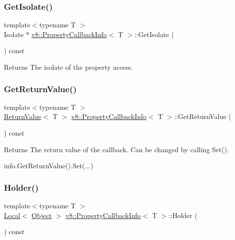 \subsubsection{\texorpdfstring{Get\+Isolate()}{GetIsolate()}}
{\footnotesize\ttfamily template$<$typename T $>$ \\
Isolate $\ast$ \mbox{\hyperlink{classv8_1_1PropertyCallbackInfo}{v8\+::\+Property\+Callback\+Info}}$<$ T $>$\+::Get\+Isolate (\begin{DoxyParamCaption}{ }\end{DoxyParamCaption}) const}

\begin{DoxyReturn}{Returns}
The isolate of the property access. 
\end{DoxyReturn}
\mbox{\label{classv8_1_1PropertyCallbackInfo_aa0882946929c3c4df6d131fe0d8d6746}} 
\subsubsection{\texorpdfstring{Get\+Return\+Value()}{GetReturnValue()}}
{\footnotesize\ttfamily template$<$typename T $>$ \\
\mbox{\hyperlink{classv8_1_1ReturnValue}{Return\+Value}}$<$ T $>$ \mbox{\hyperlink{classv8_1_1PropertyCallbackInfo}{v8\+::\+Property\+Callback\+Info}}$<$ T $>$\+::Get\+Return\+Value (\begin{DoxyParamCaption}{ }\end{DoxyParamCaption}) const}

\begin{DoxyReturn}{Returns}
The return value of the callback. Can be changed by calling Set(). 
\begin{DoxyCode}
info.GetReturnValue().Set(...)
\end{DoxyCode}
 
\end{DoxyReturn}
\mbox{\label{classv8_1_1PropertyCallbackInfo_a66b7ec267f18bd84e8baf0a0e16187b9}} 
\subsubsection{\texorpdfstring{Holder()}{Holder()}}
{\footnotesize\ttfamily template$<$typename T $>$ \\
\mbox{\hyperlink{classv8_1_1Local}{Local}}$<$ \mbox{\hyperlink{classv8_1_1Object}{Object}} $>$ \mbox{\hyperlink{classv8_1_1PropertyCallbackInfo}{v8\+::\+Property\+Callback\+Info}}$<$ T $>$\+::Holder (\begin{DoxyParamCaption}{ }\end{DoxyParamCaption}) const}

